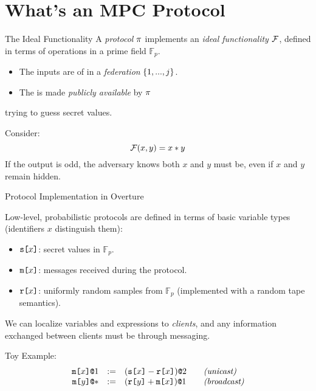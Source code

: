 \documentclass{beamer}
\begin{document}
\section{What's an MPC Protocol}

\begin{frame}{The Ideal Functionality}
  A \emph{protocol} $\pi$ implements an \emph{ideal functionality} $\mathcal{F}$,
  defined in terms of operations in a prime field $\mathbb{F}_p$.
  \begin{itemize}
  \item The inputs are  of  in a \emph{federation}
    $\{ 1,...,j \}$.
  \item The  is made \emph{publicly available} by $\pi$
  \end{itemize}
   trying to
  guess secret values.

  \begin{exampleblock}{Consider:}
  $$
  \mathcal{F}(x,y) = x * y
  $$
  If the output is odd, the adversary knows both $x$ and $y$ must be, even
  if $x$ and $y$ remain hidden.
  \end{exampleblock}
  
\end{frame}
 
\begin{frame}{Protocol Implementation in Overture}

  Low-level, probabilistic protocols are defined in terms of basic variable types
  (identifiers $x$ distinguish them):
  \begin{itemize}
  \item $\texttt{s[}x\texttt{]}$: secret values in $\mathbb{F}_p$.
  \item $\texttt{m[}x\texttt{]}$: messages received during the protocol.
  \item $\texttt{r[}x\texttt{]}$: uniformly random samples from $\mathbb{F}_p$ (implemented with
    a random tape semantics).
  \end{itemize}
  We can localize variables and expressions to \emph{clients}, and any information
  exchanged between clients must be through messaging.
  \begin{exampleblock}{Toy Example:}
    $$
    \begin{array}{rcl@{\qquad}l}
      \mx{x}{1} &:=& \elab{(\secret{x} - \flip{x})}{2}  & \textit{(unicast)}\\
      \mx{y}{*} &:=& \elab{(\flip{y} + \mesg{x})}{1}  & \textit{(broadcast)}
    \end{array}
    $$ 
  \end{exampleblock}
\end{frame}
\end{document}
